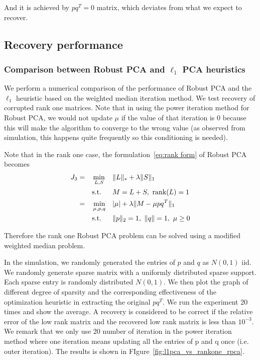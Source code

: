 And it is achieved by $pq^{T}=0$ matrix, which deviates from what
we expect to recover.


\subsection{Recovery performance}


\subsubsection{Comparison between Robust PCA and $\ell_{1}$ PCA heuristics}

We perform a numerical comparison of the performance of Robust PCA and the $\ell_{1}$ heuristic based on the weighted median iteration method. We test recovery of corrupted rank one matrices. Note that in using the power iteration method for Robust PCA, we would not update $\mu$ if the value of that iteration is 0 because this will make the algorithm to converge to the wrong value (as observed from simulation, this happens quite frequently so this conditioning is needed).

Note that in the rank one case, the formulation~\eqref{eq:rank form} of Robust PCA becomes
\begin{alignat}{3}
J_{3}
&= &&\min_{L, S}  && \|L\|_{*} + \lambda \|S\|_{1} \notag \\
&&&\text{s.t.} && M=L+S, \ \text{rank}(L) = 1 \notag \\
& = && \min_{\mu, p, q} && |\mu| + \lambda \|M - \mu p q^T\|_{1} \label{eq:rank_form_rk1} \\
&&& \text{s.t.} && \|p\|_2 = 1, \ \|q\| = 1, \ \mu \ge 0 \notag
\end{alignat}

Therefore the rank one Robust PCA problem can be solved using a modified weighted median problem.




In the simulation, we randomly generated the entries of $p$ and $q$ as $N(0,1)$ iid. We randomly generate sparse matrix with a uniformly distributed sparse support. Each sparse entry is randomly distributed $N(0,1)$. We then plot the graph of different degree of sparsity and the corresponding effectiveness of the optimization heuristic in extracting the original $pq^{T}$. We run the experiment 20 times and show the average. A recovery is considered to be correct if the relative error of the low rank matrix and the recovered low rank matrix is less than $10^{-3}$. We remark that we only use 20 number of iteration in the power iteration method where one iteration means updating all the entries of p and q once (i.e. outer iteration). The results is shown in FIgure~\ref{fig:l1pca_vs_rankone_rpca}.

